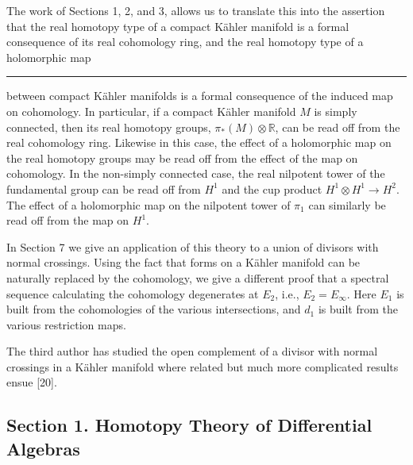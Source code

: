 \documentclass[
  english,
  a3paper,
  a3paper]{extarticle}
\begin{document}
The work of Sections 1, 2, and 3, allows us to translate this into the
assertion that the real homotopy type of a compact Kähler manifold is a
formal consequence of its real cohomology ring, and the real homotopy
type of a holomorphic map

\clearpage



\par

\vspace{0.7mm}\hrule\vspace{1.6mm}

\fontsize{9}{11}\selectfont

between compact Kähler manifolds is a formal consequence of the induced
map on cohomology. In particular, if a compact Kähler manifold \(M\) is
simply connected, then its real homotopy groups,
\(\pi_*(M)\otimes\mathbb R\), can be read off from the real cohomology
ring. Likewise in this case, the effect of a holomorphic map on the real
homotopy groups may be read off from the effect of the map on
cohomology. In the non-simply connected case, the real nilpotent tower
of the fundamental group can be read off from \(H^1\) and the cup
product \(H^1\otimes H^1\to H^2\). The effect of a holomorphic map on
the nilpotent tower of \(\pi_1\) can similarly be read off from the map
on \(H^1\).

In Section 7 we give an application of this theory to a union of
divisors with normal crossings. Using the fact that forms on a Kähler
manifold can be naturally replaced by the cohomology, we give a
different proof that a spectral sequence calculating the cohomology
degenerates at \(E_2\), i.e., \(E_2=E_\infty\). Here \(E_1\) is built
from the cohomologies of the various intersections, and \(d_1\) is built
from the various restriction maps.

The third author has studied the open complement of a divisor with
normal crossings in a Kähler manifold where related but much more
complicated results ensue {[}20{]}.

\subsection{Section 1. Homotopy Theory of Differential
Algebras}\label{section-1.-homotopy-theory-of-differential-algebras}
\end{document}
